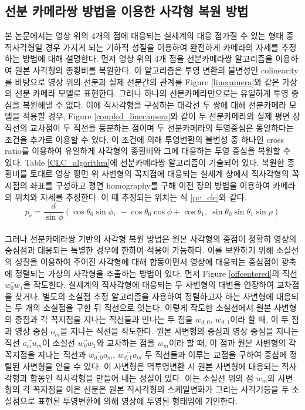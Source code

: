 \documentclass[master,korean,final]{cbnu-ecs}
\begin{document}
\subsection{선분 카메라쌍 방법을 이용한 사각형 복원 방법}
본 논문에서는 영상 위의 4개의 점에 대응되는 실세계의 대응 점가질 수 있는 형태 중 직사각형일 경우 가지게 되는 기하적 성질을 이용하여 완전하게 카메라의 자세를 추정하는 방법에 대해 설명한다. 먼저 영상 위의 4개 점을 선분카메라쌍 알고리즘\cite{Lee2012,Lee2013}을 이용하여 원본 사각형의 종횡비를 복원한다. 이 알고리즘은 투영 변환의 불변성인 colinearity를 바탕으로 영상 위의 선분과 실제 선분간의 관계를 Figure \ref{linecamera}와 같은 가상의 선분 카메라 모델로 표현한다. 그러나 하나의 선분카메라만으로는 유일하게 투영 중심을 복원해낼 수 없다. 이에 직사각형을 구성하는 대각선 두 쌍에 대해 선분카메라 모델을 적용할 경우, Figure \ref{coupled_linecamera}와 같이 두 선분카메라의 실제 평면 상 직선의 교차점이 두 직선을 등분하는 점이며 두 선분카메라의 투영중심은 동일하다는 조건을 추가로 이용할 수 있다. 이 조건에 의해 투영변환의 불변성 중 하나인 cross ratio를 이용하여 유일하게 사각형의 종횡비와 그에 대응하는 투영 중심을 복원할 수 있다. Table \ref{CLC_algorithm}에 선분카메라쌍 알고리즘이 기술되어 있다. 복원한 종횡비를 토대로 영상 평면 위 사변형의 꼭지점에 대응되는 실세계 상에서 직사각형의 꼭지점의 좌표를 구성하고 평면 homography를 구해 이전 장의 방법을 이용하여 카메라의 위치와 자세를 추정한다. 이 때 추정되는 위치는 식 \ref{pc_clc}와 같다.
\begin{equation}
\label{pc_clc}
p_c = \frac{d}{\sin\phi}(\cos\theta_0\sin\phi,\ -\cos\theta_0\cos\phi+\cos\theta_1,\ \sin\theta_0\sin\theta_1\sin\rho)
\end{equation}
\\
그러나 선분카메라쌍 기반의 사각형 복원 방법은 원본 사각형의 중점이 정확히 영상의 중심점과 대응되는 특별한 경우에 한하여 적용이 가능하다. 이를 보완하기 위해 소실선의 성질을 이용하여 주어진 사각형에 대해 합동이면서 영상에 대응되는 중심점이 광축에 정렬되는 가상의 사각형을 추출하는 방법이 있다\cite{Lee2014}. 먼저 Figure \ref{offcentered}의 직선 $\overleftrightarrow{w_0 w_1}$을 작도한다. 실세계의 직사각형에 대응되는 두 사변형의 대변을 연장하여 교차점을 찾거나, 별도의 소실점 추정 알고리즘을 사용하여 정렬하고자 하는 사변형에 대응되는 두 개의 소실점을 구한 뒤 직선으로 잇는다. 이렇게 작도한 소실선에서 원본 사변형의 중점과 각 꼭지점을 지나는 직선들과 만나는 두 점을 $w_{d,0}$, $w_{d,1}$이라 할 때, 이 두 점과 영상 중심 $o_m$을 지나는 직선을 작도한다. 원본 사변형의 중심과 영상 중심을 지나는 직선 $\overleftrightarrow{o_m u_m}$이 소실선 $\overleftrightarrow{w_0 w_1}$와 교차하는 점을 $w_m$이라 할 때, 이 점과 원본 사변형의 각 꼭지점을 지나는 직선과 $\overleftrightarrow{w_{d,0} o_m}$, $\overleftrightarrow{w_{d,1} o_m}$ 두 직선들과 이루는 교점을 구하여 중심에 정렬된 사변형을 얻을 수 있다. 이 사변형은 역투영변환 시 원본 사변형에 대응되는 직사각형과 합동인 직사각형을 만들어 내는 성질이 있다. 이는 소실선 위의 점 $w_m$와 사변형의 각 꼭지점을 이은 선분은 원본 직사각형의 스케일변화가 그리는 사각기둥을 두 소실점으로 표현된 투영변환에 의해 영상에 투영된 형태임에 기인한다.
\end{document}
